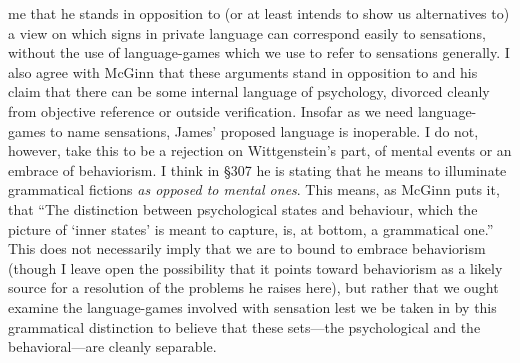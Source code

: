 \documentclass[man,12pt,natbib]{apa6}
\begin{document}
me that he stands in opposition to (or at least intends to show us alternatives
to) a view on which signs in private language can correspond easily to
sensations, without the use of language-games which we use to refer to
sensations generally.
I also agree with McGinn that these arguments stand in opposition to
\citet{James90} and his claim that there can be some internal language of
psychology, divorced cleanly from objective reference or outside verification.
Insofar as we need language-games to name sensations, James' proposed language
is inoperable. I do not, however, take this to be a rejection on Wittgenstein's
part, of mental events or an embrace of behaviorism. I think in \S 307 he is
stating that he means to illuminate grammatical fictions \emph{as opposed to
mental ones}. This means, as McGinn puts it, that ``The distinction between
psychological states and behaviour, which the picture of `inner states' is
meant to capture, is, at bottom, a grammatical one.'' This does not necessarily
imply that we are to bound to embrace behaviorism (though I leave open the
possibility that it points toward behaviorism as a likely source for a
resolution of the problems he raises here), but rather that we ought examine
the language-games involved with sensation lest we be taken in by this
grammatical distinction to believe that these sets---the psychological and the
behavioral---are cleanly separable.
\end{document}
